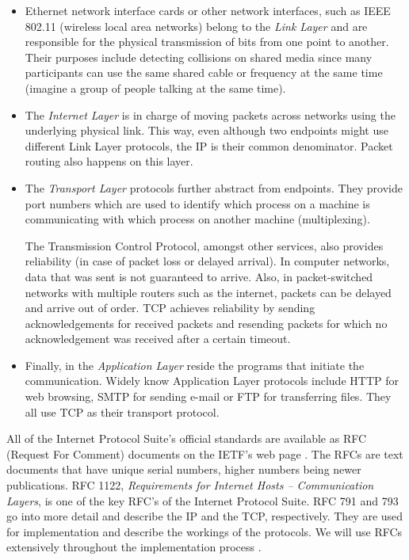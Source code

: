 \documentclass[11pt,twoside,abstract,notitlepage]{scrreprt}
\begin{document}
\begin{itemize}
	\item Ethernet network interface cards or other network interfaces, such as IEEE 802.11 (wireless local area networks) belong to the \emph{Link Layer} and are responsible for the physical transmission of bits from one point to another. Their purposes include detecting collisions on shared media since many participants can use the same shared cable or frequency at the same time (imagine a group of people talking at the same time).

    \item The \emph{Internet Layer} is in charge of moving packets across networks using the underlying physical link. This way, even although two endpoints might use different Link Layer protocols, the IP is their common denominator. Packet routing also happens on this layer. 

    \item The \emph{Transport Layer} protocols further abstract from endpoints. They provide port numbers which are used to identify which process on a machine is communicating with which process on another machine (multiplexing).
    
     The Transmission Control Protocol, amongst other services, also provides reliability (in case of packet loss or delayed arrival). In computer networks, data that was sent is not guaranteed to arrive. Also, in packet-switched networks with multiple routers such as the internet, packets can be delayed and arrive out of order. TCP achieves reliability by sending acknowledgements for received packets and resending packets for which no acknowledgement was received after a certain timeout. 
     
    \item Finally, in the \emph{Application Layer} reside the programs that initiate the communication. Widely know Application Layer protocols include HTTP for web browsing, SMTP for sending e-mail or FTP for transferring files. They all use TCP as their transport protocol.
\end{itemize}

All of the Internet Protocol Suite's official standards are available as RFC (Request For Comment) documents on the IETF's web page \cite{ietf}. The RFCs are text documents that have unique serial numbers, higher numbers being newer publications. RFC 1122, \emph{Requirements for Internet Hosts -- Communication Layers}, is one of the key RFC's of the Internet Protocol Suite. RFC 791 and 793 go into more detail and describe the IP and the TCP, respectively. They are used for implementation and describe the workings of the protocols. We will use RFCs extensively throughout the implementation process \cite{stevens94}.
\end{document}
